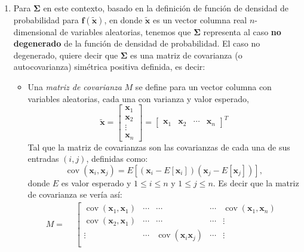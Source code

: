 \begin{problema}
\begin{enumerate}
\begin{sol}
\begin{enumerate}
            \item Para $\boldsymbol{\Sigma}$ en este contexto, basado en la definición de función de densidad de probabilidad para $\mathbf{f}(\tilde{\boldsymbol{x}})$, en donde $\tilde{\boldsymbol{x}}$ es un vector columna real $n$-dimensional de variables aleatorias, tenemos que $\boldsymbol{\Sigma}$ representa al caso \textbf{no degenerado} de la función de densidad de probabilidad. El caso no degenerado, quiere decir que $\boldsymbol{\Sigma}$ es una matriz de covarianza (o autocovarianza) simétrica positiva definida, es decir: 
            \begin{itemize}
                \item Una \textit{matriz de covarianza} $M$ se define para un vector columna con variables aleatorias, cada una con varianza y valor esperado, 
                $$\tilde{\boldsymbol{x}}=\begin{bmatrix}
                    \boldsymbol{x}_1\\
                    \boldsymbol{x}_2\\
                    \vdots\\
                    \boldsymbol{x}_n
                \end{bmatrix} = \begin{bmatrix}
                    \boldsymbol{x}_1 & 
                    \boldsymbol{x}_2 &
                    \cdots &
                    \boldsymbol{x}_n
                \end{bmatrix}^T  $$ 
                Tal que la matriz de covarianzas son las covarianzas de cada una de sus entradas $(i,j)$, definidas como: 
                $$\operatorname{cov}(\boldsymbol{x}_i,\boldsymbol{x}_j)=E\left[\left(\boldsymbol{x}_i-E[\boldsymbol{x}_i]\right)\left(\boldsymbol{x}_j-E[\boldsymbol{x}_j]\right)\right],$$
                donde $E$ es valor esperado y $1\leq i\leq n$ y $1\leq j\leq n$. Es decir que la matriz de covarianza se vería así: 
                $$M=
\begin{aligned}
& \left[\begin{array}{ccccc}
    \operatorname{cov}(\boldsymbol{x}_1,\boldsymbol{x}_1) & \cdots & \cdots & \cdots & \operatorname{cov}(\boldsymbol{x}_1 ,\boldsymbol{x}_n) \\
    \operatorname{cov}(\boldsymbol{x}_2,\boldsymbol{x}_1) & \cdots & \cdots & \cdots & \vdots \\
\vdots & \cdots & \operatorname{cov}(\boldsymbol{x}_i \boldsymbol{x}_j) & \cdots & \vdots \\

\end{array}
\end{aligned}$$
\end{itemize}
\end{enumerate}
\end{sol}
\end{enumerate}
\end{problema}
